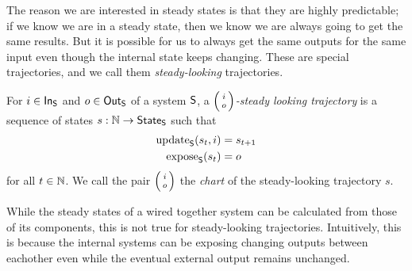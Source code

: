 \documentclass[DynamicalBook]{subfiles}
\begin{document}
The reason we are interested in steady states is that they are highly
predictable; if we know we are in a steady state, then we know we are always
going to get the same results. But it is possible for us to always get the same
outputs for the same input even though the internal state keeps changing. These
are special trajectories, and we call them \emph{steady-looking} trajectories.

\begin{definition}\label{def.steady_looking_trajectory_discrete}
  For $i \in \mathsf{In}_{\mathsf{S}}$ and $o \in \mathsf{Out}_{\mathsf{S}}$ of a system $\mathsf{S}$, a \emph{$\lens{i}{o}$-steady
    looking trajectory} is a sequence of states $s : \mathbb{N} \to \mathsf{State}_{\mathsf{S}}$ such
  that
  \begin{align*}
    \mathrm{update}_{\mathsf{S}}(s_t, i) &= s_{t + 1} \\
    \mathrm{expose}_{\mathsf{S}}(s_t) &= o
  \end{align*}
  for all $t \in \mathbb{N}$. We call the pair $\lens{i}{o}$ the \emph{chart} of the
  steady-looking trajectory $s$.
\end{definition}

While the steady states of a wired together system can be calculated from those
of its components, this is not true for steady-looking trajectories.
Intuitively, this is because the internal systems can be exposing changing
outputs between eachother even while the eventual external output remains
unchanged.
\end{document}
